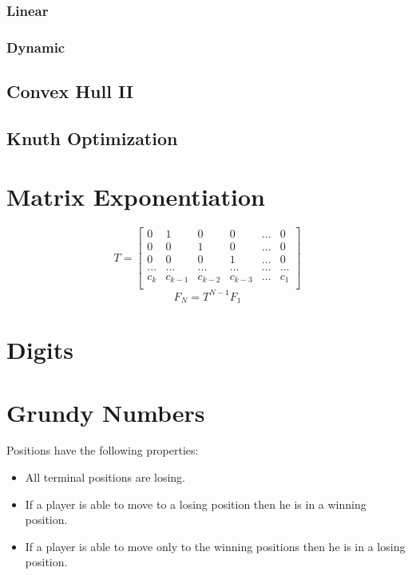 \documentclass[10pt,a4paper]{report}
\begin{document}
			\subsubsection{Linear}
				
			\newpage
			\subsubsection{Dynamic}
				
		\subsection{Convex Hull II}
		\newpage
		\subsection{Knuth Optimization}
			
	\newpage
	\section{Matrix Exponentiation}
	\[
	T=
		\begin{bmatrix}
		0 & 1 & 0 & 0 & ... & 0 \\
		0 & 0 & 1 & 0 & ... & 0 \\
		0 & 0 & 0 & 1 & ... & 0 \\
		... & ... & ... & ... & ... & ... \\
		c_{k} & c_{k-1} & c_{k-2} & c_{k-3} & ... & c_{1} \\
		\end{bmatrix}
	\]
	$$F_{N} = T^{N-1}F_{1}$$
		
	\newpage
	\section{Digits}
		
	\newpage
	\section{Grundy Numbers}
		Positions have the following properties:
		\begin{itemize}
			\item All terminal positions are losing.
			\item If a player is able to move to a losing position then he is in a winning position.
			\item If a player is able to move only to the winning positions then he is in a losing position.
		\end{itemize}
		
	\newpage
\end{document}
